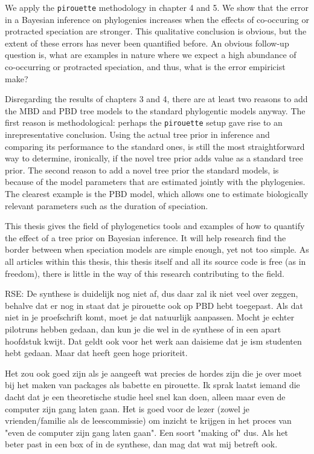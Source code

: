 We apply the \verb;pirouette; methodology in chapter 4 and 5.
We show that the error in a Bayesian inference on
phylogenies increases when the effects of co-occuring 
or protracted speciation are stronger. 
This qualitative conclusion is obvious, 
but the extent of these errors has never been quantified before.
An obvious follow-up question is, 
what are examples in nature where we expect a high 
abundance of co-occurring or protracted speciation, 
and thus, what is the
error empiricist make?

Disregarding the results of chapters 3 and 4, there are
at least two reasons to add the MBD and PBD tree models to the standard
phylogentic models anyway. The first reason is methodological: perhaps
the \verb;pirouette; setup gave rise to an inrepresentative conclusion.
Using the actual tree prior in inference and comparing its performance
to the standard ones, is still the most straightforward way to determine,
ironically, if the novel tree prior adds value as a standard tree prior.
The second reason to add a novel tree prior the standard models, is
because of the model parameters that are estimated jointly with the
phylogenies. The clearest example is the PBD model, which allows one
to estimate biologically relevant parameters such as the duration of speciation.

This thesis gives the field of phylogenetics tools and examples of
how to quantify the effect of a tree prior on Bayesian inference.
It will help research find the border between when speciation models are
simple enough, yet not too simple. As all articles within this thesis,
this thesis itself and all its source code is free (as in freedom),
there is little in the way of this research contributing to the field. 



RSE: De synthese is duidelijk nog niet af, dus daar zal ik niet veel over zeggen, 
behalve dat er nog in staat dat je pirouette ook op PBD hebt toegepast. 
Als dat niet in je proefschrift komt, moet je dat natuurlijk aanpassen. 
Mocht je echter pilotruns hebben gedaan, 
dan kun je die wel in de synthese of in een apart hoofdstuk kwijt. 
Dat geldt ook voor het werk aan daisieme dat je ism studenten hebt gedaan. 
Maar dat heeft geen hoge prioriteit.

Het zou ook goed zijn als je aangeeft wat precies de hordes zijn die je over 
moet bij het maken van packages als babette en pirouette. 
Ik sprak laatst iemand die dacht dat je een theoretische studie heel snel kan doen, 
alleen maar even de computer zijn gang laten gaan. 
Het is goed voor de lezer (zowel je vrienden/familie als de leescommissie) 
om inzicht te krijgen in het proces van "even de computer zijn gang laten gaan". 
Een soort "making of" dus. Als het beter past in een box of in de synthese, 
dan mag dat wat mij betreft ook.

